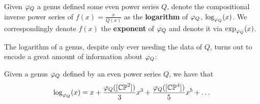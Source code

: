 \begin{definition}
Given $\varphi_Q$ a genus defined some even power series $Q$, denote the compositional inverse power series of $f(x) = \frac{x}{Q(x)}$ as the \textbf{logarithm} of $\varphi_Q$, $\log_{\varphi_Q}(x)$. We correspondingly denote $f(x)$ the \textbf{exponent} of $\varphi_Q$ and denote it via $\exp_{\varphi_Q} (x)$.  
\end{definition}

The logarithm of a genus, despite only ever needing the data of $Q$, turns out to encode a great amount of information about $\varphi_Q$:

\begin{proposition}
    Given a genus $\varphi_Q$ defined by an even power series $Q$, we have that
    \[\log_{\varphi_Q} (x) = x + \frac{\varphi_Q ([\mathbb{CP}^2])}{3} x^3 + \frac{\varphi_Q ([\mathbb{CP}^4])}{5} x^5 + \dots\]
\end{proposition}

